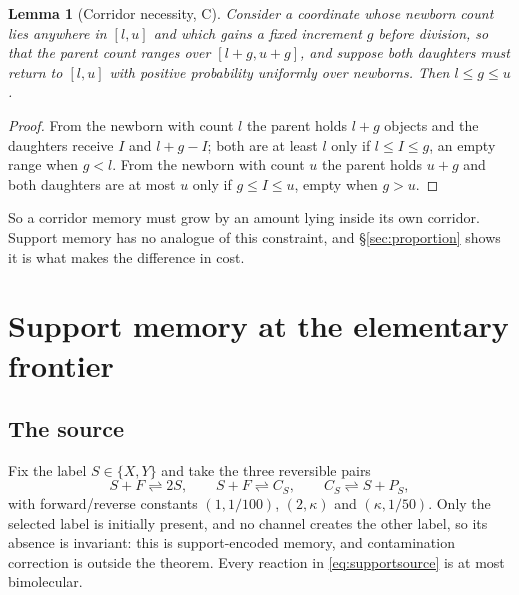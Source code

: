 \documentclass[11pt]{article}
\theoremstyle{plain}
\newtheorem{lemma}[theorem]{Lemma}
\theoremstyle{definition}
\theoremstyle{remark}
\begin{document}
\begin{lemma}[Corridor necessity, C]\label{lem:corridor}
Consider a coordinate whose newborn count lies anywhere in $[l,u]$ and which
gains a fixed increment $g$ before division, so that the parent count ranges
over $[l+g,u+g]$, and suppose both daughters must return to $[l,u]$ with
positive probability uniformly over newborns. Then $l\le g\le u$.
\end{lemma}

\begin{proof}
From the newborn with count $l$ the parent holds $l+g$ objects and the
daughters receive $I$ and $l+g-I$; both are at least $l$ only if
$l\le I\le g$, an empty range when $g<l$. From the newborn with count $u$ the
parent holds $u+g$ and both daughters are at most $u$ only if $g\le I\le u$,
empty when $g>u$. \end{proof}

So a corridor memory must grow by an amount lying inside its own corridor.
Support memory has no analogue of this constraint, and
\S\ref{sec:proportion} shows it is what makes the difference in cost.

\section{Support memory at the elementary frontier}\label{sec:support}

\subsection{The source}

Fix the label $S\in\{X,Y\}$ and take the three reversible pairs
\begin{equation}\label{eq:supportsource}
S+F\rightleftharpoons 2S,\qquad
S+F\rightleftharpoons C_S,\qquad
C_S\rightleftharpoons S+P_S,
\end{equation}
with forward/reverse constants $(1,1/100)$, $(2,\kappa)$ and
$(\kappa,1/50)$. Only the selected label is initially present, and no channel
creates the other label, so its absence is invariant: this is
support-encoded memory, and contamination correction is outside the theorem.
Every reaction in \eqref{eq:supportsource} is at most bimolecular.
\end{document}
